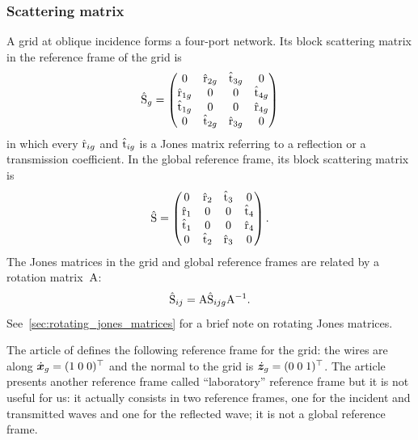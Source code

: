 \subsubsection{Scattering matrix}
A grid at oblique incidence forms a four-port network.
Its block scattering matrix in the reference frame of the grid is
\begin{equation}
    \hat{\mathrm{S}}_g
    =
    \begin{pmatrix}
        0               & \hat{\mathrm{r}}_{2g} & \hat{\mathrm{t}}_{3g} & 0               \\
        \hat{\mathrm{r}}_{1g} & 0               & 0               & \hat{\mathrm{t}}_{4g} \\
        \hat{\mathrm{t}}_{1g} & 0               & 0               & \hat{\mathrm{r}}_{4g} \\
        0               & \hat{\mathrm{t}}_{2g} & \hat{\mathrm{r}}_{3g} & 0
    \end{pmatrix}
    \label{eq:grid_scattering_local}
\end{equation}
in which every $\hat{\mathrm{r}}_{ig}$ and $\hat{\mathrm{t}}_{ig}$ is a Jones matrix referring to a reflection or a transmission coefficient.
In the global reference frame, its block scattering matrix is
\begin{equation}
    \hat{\mathrm{S}}
    =
    \begin{pmatrix}
        0              & \hat{\mathrm{r}}_{2} & \hat{\mathrm{t}}_{3} & 0               \\
        \hat{\mathrm{r}}_{1} & 0              & 0              & \hat{\mathrm{t}}_{4} \\
        \hat{\mathrm{t}}_{1} & 0              & 0              & \hat{\mathrm{r}}_{4} \\
        0              & \hat{\mathrm{t}}_{2} & \hat{\mathrm{r}}_{3} & 0
    \end{pmatrix}
    \text{.}
    \label{eq:grid_scattering_global}
\end{equation}
The Jones matrices in the grid and global reference frames are related by a rotation matrix~$\mathrm{A}$:
\begin{equation}
    \hat{\mathrm{S}}_{ij} = \mathrm{A} \hat{\mathrm{S}}_{ijg} \mathrm{A}^{-1}
    \text{.}
    \label{eq:grid_rotation}
\end{equation}
See~\cref{sec:rotating_jones_matrices} for a brief note on rotating Jones matrices.

The article of \citeauthor{houde_2001} \cite{houde_2001} defines the following reference frame for the grid: the wires are along $\dot{\bm{x}}_g=(1 \; 0 \; 0)^\top$ and the normal to the grid is $\dot{\bm{z}}_g=(0 \; 0 \; 1)^\top$.
The article presents another reference frame called ``laboratory'' reference frame but it is not useful for us: it actually consists in two reference frames, one for the incident and transmitted waves and one for the reflected wave; it is not a global reference frame.

